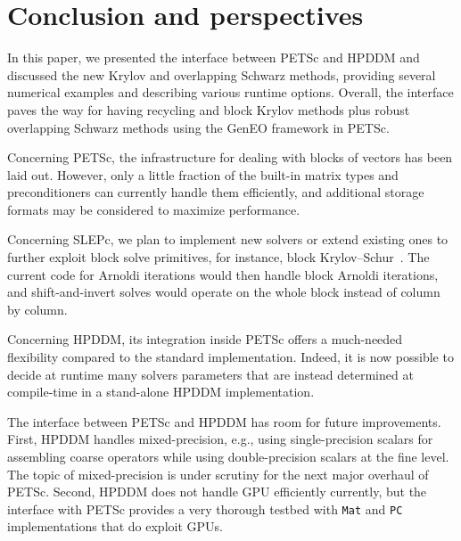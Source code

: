 \documentclass[3p,11pt]{elsarticle}
\newcommand{\pk}[1]{\texttt{#1}}
\begin{document}
\section{Conclusion and perspectives}\label{sec:conclusion}

In this paper, we presented the interface between PETSc and HPDDM and discussed the new Krylov and overlapping Schwarz methods, providing several
numerical examples and describing various runtime options. %
Overall, the interface paves the way for having recycling and block Krylov
methods plus robust overlapping Schwarz methods using the GenEO framework in
PETSc.

Concerning PETSc, the infrastructure for dealing with blocks of vectors has
been laid out. However, only a little fraction of the built-in matrix types and
preconditioners can currently handle them efficiently, and additional
storage formats may be considered to maximize performance.

Concerning SLEPc, we plan to implement new solvers or extend existing ones to
further exploit block solve primitives, for instance, block
Krylov--Schur~\cite{zhou2008block}. The current code for Arnoldi iterations
would then handle block Arnoldi iterations, and shift-and-invert solves would
operate on the whole block instead of column by column.

Concerning HPDDM, its integration inside PETSc offers a much-needed flexibility
compared to the standard implementation. Indeed, it is now possible to decide at
runtime many solvers parameters that are instead determined at compile-time in a
stand-alone HPDDM implementation.

The interface between PETSc and HPDDM has room for future improvements.  First,
HPDDM handles mixed-precision,
e.g., using single-precision scalars for assembling coarse operators while
using double-precision scalars at the fine level. The topic of mixed-precision
is under scrutiny for the next major overhaul of PETSc. Second, HPDDM does not
handle GPU efficiently currently, but the interface with PETSc provides a very
thorough testbed with \pk{Mat} and \pk{PC} implementations that do exploit
GPUs.
\end{document}

